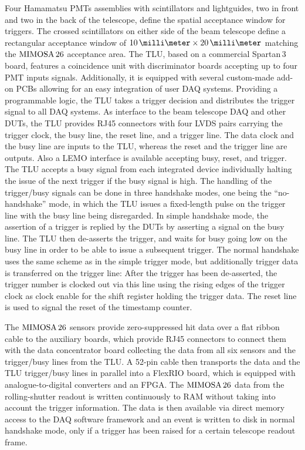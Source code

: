 Four Hamamatsu PMTs assemblies with scintillators and lightguides, two in front and two in the back of the telescope, define the spatial acceptance window for triggers. 
The crossed scintillators on either side of the beam telescope define a rectangular acceptance window of $10\,\milli\meter \times 20\,\milli\meter$ matching the $\textrm{MIMOSA\,26}$ acceptance area. 
The TLU, based on a commercial Spartan\,3 board, features a coincidence unit with discriminator boards accepting up to four PMT inputs signals. 
Additionally, it is equipped with several custom-made add-on PCBs allowing for an easy integration of user DAQ systems. 
Providing a programmable logic, the TLU  takes a trigger decision and distributes the trigger signal to all DAQ systems.
As interface to the beam telescope DAQ and other DUTs, the TLU provides RJ45 connectors with four LVDS pairs carrying the trigger clock, the busy line, the reset line, and a trigger line. 
The data clock and the busy line are inputs to the TLU, whereas the reset and the trigger line are outputs. 
Also a LEMO interface is available accepting busy, reset, and trigger. 
The TLU accepts a busy signal from each integrated device individually halting the issue of the next trigger if the busy signal is high. 
The handling of the trigger/busy signals can be done in three handshake modes, one being the ``no-handshake'' mode,
 in which the TLU issues a fixed-length pulse on the trigger line with the busy line being disregarded. 
In simple handshake mode, the assertion of a trigger is replied by the DUTs by asserting a signal on the busy line. 
The TLU then de-asserts the trigger, and waits for busy going low on the busy line in order to be able to issue a subsequent trigger.
The normal handshake uses the same scheme as in the simple trigger mode, but additionally trigger data is transferred on the trigger line:
After the trigger has been de-asserted, the trigger number is clocked out via this line using the rising edges of the trigger clock as clock enable for the shift register holding the trigger data. 
The reset line is used to signal the reset of the timestamp counter.

The $\textrm{MIMOSA\,26}$ sensors provide zero-suppressed hit data over a flat ribbon cable to the auxiliary boards, which provide RJ45 connectors to connect them with the
 data concentrator board collecting the data from all six sensors and the trigger/busy lines from the TLU. 
A 52-pin cable then transports the data and the TLU trigger/busy lines in parallel into a FlexRIO board, which is equipped with analogue-to-digital converters and an FPGA. 
The $\textrm{MIMOSA\,26}$ data from the rolling-shutter readout is written continuously to RAM without taking into account the trigger information. 
The data is then available via direct memory access to the DAQ software framework and an event is written to disk in normal handshake mode, only if a trigger has been raised for a certain telescope readout frame. 

